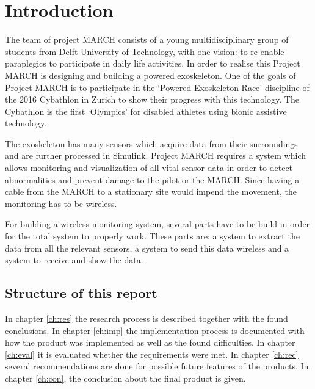 \chapter{Introduction}
The team of project MARCH consists of a young multidisciplinary group of students from Delft University of Technology, with one vision: to re-enable paraplegics to participate in daily life activities. In order to realise this Project MARCH is designing and building a powered exoskeleton. One of the goals of Project MARCH is to participate in the ‘Powered Exoskeleton Race’-discipline of the 2016 Cybathlon in Zurich to show their progress with this technology. The Cybathlon is the first ‘Olympics’ for disabled athletes using bionic assistive technology.
 
The exoskeleton has many sensors which acquire data from their surroundings and are further processed in Simulink. Project MARCH requires a system which allows monitoring and visualization of all vital sensor data in order to detect abnormalities and prevent damage to the pilot or the MARCH. Since having a cable from the MARCH to a stationary site would impend the movement, the monitoring has to be wireless. 		

For building a wireless monitoring system, several parts have to be build in order for the total system to properly work. These parts are: a system to extract the data from all the relevant sensors, a system to send this data wireless and a system to receive and show the data.

\section{Structure of this report}
In chapter \ref{ch:res} the research process is described together with the found conclusions. In chapter \ref{ch:imp} the implementation process is documented with how the product was implemented as well as the found difficulties. In chapter \ref{ch:eval} it is evaluated whether the requirements were met. In chapter \ref{ch:rec} several recommendations are done for possible future features of the products.  In chapter \ref{ch:con}, the conclusion about the final product is given.
